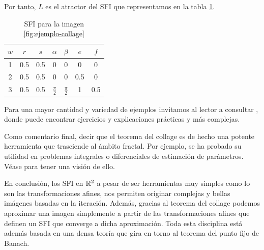 \begin{ejemplo}
    Por tanto, $L$ es el atractor del SFI que representamos en la tabla \ref{tabla:ejemplo-collage}.

    \begin{table}[ht]
        \centering
        \begin{tabular}{c|cccccc} \hline
        $w$ & $r$ & $s$ & $\alpha$ & $\beta$ & $e$ & $f$ \\ \hline\hline
        1 & 0.5 & 0.5 & 0 & 0 & 0 & 0 \\ \hline
        2 & 0.5 & 0.5 & 0 & 0 & 0.5 & 0 \\ \hline
        3 & 0.5 & 0.5 & $\frac{\pi}{2}$ & $\frac{\pi}{2}$ & 1 &  0.5 \\ \hline
        \end{tabular}
        \caption{SFI para la imagen \ref{fig:ejemplo-collage}}
        \label{tabla:ejemplo-collage}
    \end{table}
\end{ejemplo}

Para una mayor cantidad y variedad de ejemplos invitamos al lector a consultar \cite[Sección 3.10]{Barnsley}, donde puede encontrar ejercicios y explicaciones prácticas y más complejas.

Como comentario final, decir que el teorema del collage es de hecho una potente herramienta que trasciende al ámbito fractal. Por ejemplo, se ha probado su utilidad en problemas integrales o diferenciales de estimación de parámetros. Véase \cite{LaTorre} para tener una visión de ello.

En conclusión, los SFI en $\mathbb{R}^2$ a pesar de ser herramientas muy simples como lo son las transformaciones afines, nos permiten originar complejas y bellas imágenes basadas en la iteración. Además, gracias al teorema del collage podemos aproximar una imagen simplemente a partir de las transformaciones afines que definen un SFI que converge a dicha aproximación. Toda esta disciplina está además basada en una densa teoría que gira en torno al teorema del punto fijo de Banach.

